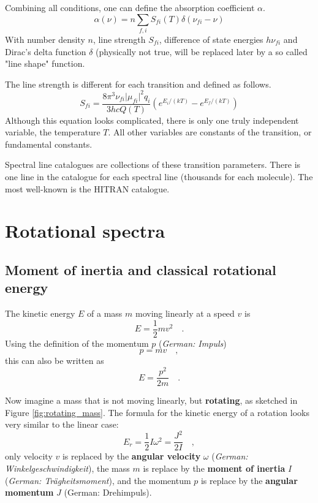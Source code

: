 Combining all conditions, one can define the absorption coefficient $\alpha$.
\begin{equation}
  \alpha(\nu) = n \sum_{f,i} S_{fi}(T) \delta(\nu_{fi} - \nu)
\end{equation}
With number density $n$, line strength $S_{fi}$, difference of state energies
$h\nu_{fi}$ and Dirac's delta function $\delta$ (physically not true, will be
replaced later by a so called "line shape" function.

The line strength is different for each transition and defined as follows.
\begin{equation}
    S_{fi} = \frac{8\pi^3\nu_{fi} \lvert\mu_{fi}\rvert^2 q_i}{3hcQ(T)}
      \left( e^{E_i/(kT)} - e^{E_f/(kT)} \right)
\end{equation}
Although this equation looks complicated, there is only one truly independent
variable, the temperature $T$. All other variables are constants of the
transition, or fundamental constants.

Spectral line catalogues are collections of these transition parameters. There
is one line in the catalogue for each spectral line (thousands for each
molecule). The most well-known is the HITRAN catalogue.


\section{Rotational spectra}
\label{sec:rotational_spectra}

\subsection{Moment of inertia and classical rotational energy}

The kinetic energy $E$ of a mass $m$ moving linearly at a speed $v$ is
\begin{equation}
  E = \frac{1}{2} m v^2 \quad .
\end{equation}
Using the definition of the momentum $p$ (\emph{German: Impuls})
\begin{equation}
  p = m v \quad ,
\end{equation}
this can also be written as
\begin{equation}
  E = \frac{p^2}{2m} \quad .
\end{equation}

Now imagine a mass that is not moving linearly, but \textbf{rotating},
as sketched in Figure \ref{fig:rotating_mass}. The formula for the
kinetic energy of a rotation looks very similar to the linear case:
\begin{equation}
  \label{eq:rotational_energy}
  E_r = \frac{1}{2} I \omega^2 = \frac{J^2}{2I} \quad ,  
\end{equation}
only velocity $v$ is replaced by the \textbf{angular velocity}
$\omega$ (\emph{German: Winkelgeschwindigkeit}), the mass $m$ is
replace by the \textbf{moment of inertia} $I$ (\emph{German:
  Trägheitsmoment}), and the momentum $p$ is replace by the
\textbf{angular momentum} $J$ (German: Drehimpuls).

